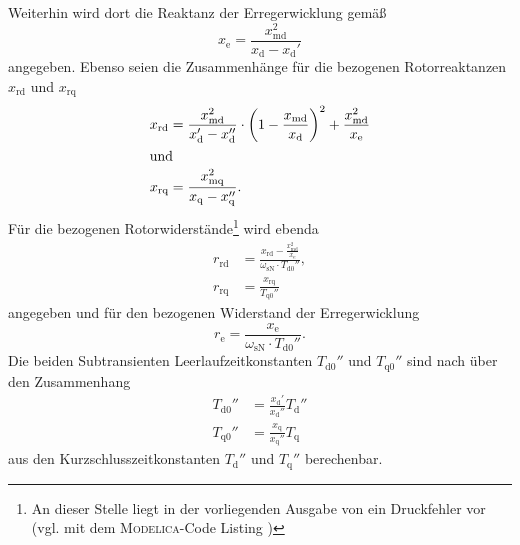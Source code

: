 Weiterhin wird dort die Reaktanz der Erregerwicklung gemäß
\begin{equation}
    x_{\mathrm{e}} = \frac{x_{\mathrm{md}}^2}{x_{\mathrm{d}}-x_{\mathrm{d}}'}
\end{equation}
angegeben. Ebenso seien die Zusammenhänge für die bezogenen Rotorreaktanzen \(x_{\mathrm{rd}}\) und \(x_{\mathrm{rq}}\)
\begin{align}
    x_{\mathrm{rd}} &= \frac{x_{\mathrm{md}}^2}{x_{\mathrm{d}}' - x_{\mathrm{d}}''}\cdot \left( 1-\frac{x_{\mathrm{md}}}{x_{\mathrm{d}}}\right)^2 + \frac{x_{\mathrm{md}}^2}{x_{\mathrm{e}}}\\
    \intertext{und}
    x_{\mathrm{rq}} &= \frac{x_{\mathrm{mq}}^2}{x_{\mathrm{q}} - x_{\mathrm{q}}''}.
\end{align}
Für die bezogenen Rotorwiderstände\footnote{An dieser Stelle liegt in der vorliegenden Ausgabe von \cite[]{kralModelicaObjektorientierteModellbildung2019} ein Druckfehler vor (vgl. mit dem \textsc{Modelica}-Code Listing \cite[S. 266]{kralModelicaObjektorientierteModellbildung2019})} wird ebenda
\begin{align}
    r_{\mathrm{rd}} &= \frac{x_{\mathrm{rd}} - \frac{x_{\mathrm{md}}^2}{x_{\mathrm{e}}}}{\omega_{\mathrm{sN}}\cdot T_{\mathrm{d0}}''}, \\
    r_{\mathrm{rq}} &= \frac{x_{\mathrm{rq}}}{T_{\mathrm{q0}}''}
\end{align}
angegeben und für den bezogenen Widerstand der Erregerwicklung
\begin{equation}
    r_{\mathrm{e}} = \frac{x_{\mathrm{e}}}{\omega_{\mathrm{sN}}\cdot T_{\mathrm{d0}}''}.
\end{equation}
Die beiden Subtransienten Leerlaufzeitkonstanten \(T_{\mathrm{d0}}''\)
und \(T_{\mathrm{q0}}''\) sind nach
\cite[S. 222ff.]{bonfertBetriebsverhaltenSynchronmaschine1962} über den Zusammenhang
\begin{align}
T_{\mathrm{d0}}'' &= \frac{x_{\mathrm{d}}'}{x_{\mathrm{d}}''}T_{\mathrm{d}}'' \\
T_{\mathrm{q0}}'' &= \frac{x_{\mathrm{q}}}{x_{\mathrm{q}}''}T_{\mathrm{q}}
\end{align}
aus den Kurzschlusszeitkonstanten \(T_{\mathrm{d}}''\) und
\(T_{\mathrm{q}}''\) berechenbar.


